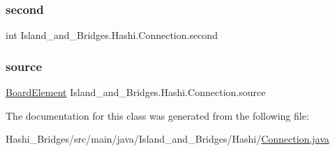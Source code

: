 \subsubsection{\texorpdfstring{second}{second}}
{\footnotesize\ttfamily int Island\+\_\+and\+\_\+\+Bridges.\+Hashi.\+Connection.\+second}

\mbox{\label{class_island__and___bridges_1_1_hashi_1_1_connection_a4422e2d5803d43a2950742eae23c2726}} 
\subsubsection{\texorpdfstring{source}{source}}
{\footnotesize\ttfamily \mbox{\hyperlink{class_island__and___bridges_1_1_hashi_1_1_board_element}{Board\+Element}} Island\+\_\+and\+\_\+\+Bridges.\+Hashi.\+Connection.\+source}



The documentation for this class was generated from the following file\+:\begin{DoxyCompactItemize}
\item 
Hashi\+\_\+\+Bridges/src/main/java/\+Island\+\_\+and\+\_\+\+Bridges/\+Hashi/\mbox{\hyperlink{_connection_8java}{Connection.\+java}}\end{DoxyCompactItemize}
